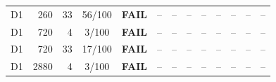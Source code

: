 \begin{longtable}{crrcp{33mm}rrrrrrrr}
D1 & 260 & 33 & 56/100 & \textbf{FAIL} & -- & -- & -- & -- & -- & -- & -- & --\\
D1 & 720 & 4 & 3/100 & \textbf{FAIL} & -- & -- & -- & -- & -- & -- & -- & --\\
D1 & 720 & 33 & 17/100 & \textbf{FAIL} & -- & -- & -- & -- & -- & -- & -- & --\\
D1 & 2880 & 4 & 3/100 & \textbf{FAIL} & -- & -- & -- & -- & -- & -- & -- & --\\

\end{longtable}
